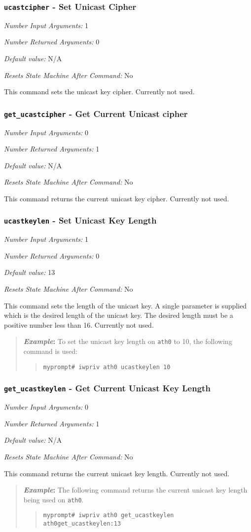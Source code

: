 \documentclass[10pt,fullpage]{article}
\newcommand{\mytt}[1]{{\texttt{#1}}}
\newcommand{\bv}{\begin{verse}}
\newcommand{\ev}{\end{verse}}
\newcommand{\cmd}[1]{{\texttt{myprompt\# #1}}}
\newcommand{\argdesc}[4]{\begin{description}
\itemsep -6pt
\item \textit{Number Input Arguments:} #1
\item \textit{Number Returned Arguments:} #2
\item \textit{Default value:} #3
\item \textit{Resets State Machine After Command:} #4
\end{description}
}
\newenvironment{example}{\begin{quote}\textbf{\textit{Example}:}}{\end{quote}}
\begin{document}
\subsubsection{\mytt{ucastcipher} - Set Unicast Cipher}
\argdesc{1}{0}{N/A}{No}
This command sets the unicast key cipher.  Currently not used.

\subsubsection{\mytt{get\_ucastcipher} - Get Current Unicast cipher}
\argdesc{0}{1}{N/A}{No}
This command returns the current unicast key cipher. Currently not
used.

\subsubsection{\mytt{ucastkeylen} - Set Unicast Key Length}
\argdesc{1}{0}{13}{No}
This command sets the length of the unicast key. A single parameter is
supplied which is the desired length of the unicast key.  The desired
length must be a positive number less than 16.  Currently not used.
\begin{example}
  To set the unicast key length on \mytt{ath0} to 10, the following
  command is used:
  \bv
  \cmd{iwpriv ath0 ucastkeylen 10}
  \ev
\end{example}

\subsubsection{\mytt{get\_ucastkeylen} - Get Current Unicast Key Length}
\argdesc{0}{1}{N/A}{No}
This command returns the current unicast key length.  Currently not
used.
\begin{example}
  The following command returns the current unicast key length being
  used on \mytt{ath0}.
  \bv
  \cmd{iwpriv ath0 get\_ucastkeylen}\\
  \mytt{ath0\hspace{32pt}get\_ucastkeylen:13}
  \ev
\end{example}
\end{document}
